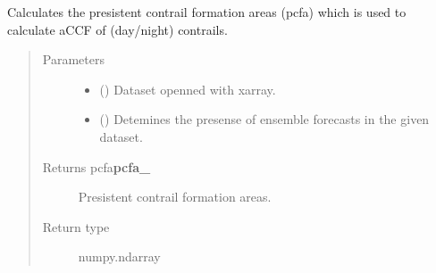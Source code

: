 \documentclass[a4paper,11pt,english]{sphinxmanual}
\begin{document}

\begin{fulllineitems}
\label{\detokenize{envlib:envlib.contrail.get_pcfa}}
\sphinxAtStartPar
Calculates the presistent contrail formation areas (pcfa) which is used to calculate aCCF of (day/night) contrails.
\begin{quote}\begin{description}
\item[{Parameters}] \leavevmode\begin{itemize}
\item {} 
\sphinxAtStartPar
{} () \textendash{} Dataset openned with xarray.

\item {} 
\sphinxAtStartPar
{} () \textendash{} Detemines the presense of ensemble forecasts in the given dataset.

\end{itemize}

\item[{Returns pcfa{\color{red}\bfseries{}pcfa\_}}] \leavevmode
\sphinxAtStartPar
Presistent contrail formation areas.

\item[{Return type}] \leavevmode
\sphinxAtStartPar
numpy.ndarray

\end{description}\end{quote}

\end{fulllineitems}

\end{document}
